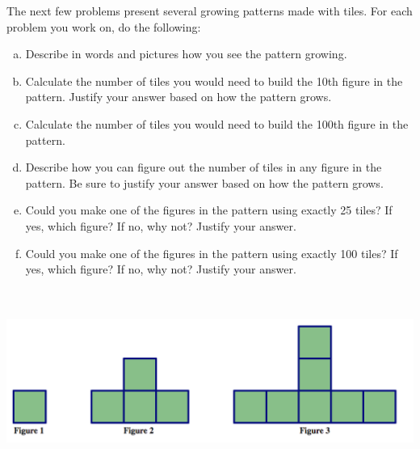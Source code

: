 The next few problems present several growing patterns made with tiles.  For each problem you work on, do the following:
\begin{enumerate}[(a)]
\item
Describe in words and pictures how you see the pattern growing.\\

\item
Calculate the number of tiles you would need to build the 10th figure in the pattern.  Justify your answer based on how the pattern grows.\\

\item
Calculate the number of tiles you would need to build the 100th figure in the pattern.  \\

\item
Describe how you can figure out the number of tiles in any figure in the pattern.  Be sure to justify your answer based on how the pattern grows.\\

\item
Could you make one of the figures in the pattern using exactly 25 tiles?  If yes, which figure?  If no, why not?  Justify your answer.\\

\item
Could you make one of the figures in the pattern using exactly 100 tiles?  If yes, which figure?  If no, why not?    Justify your answer.\\



\end{enumerate}

\bigskip

\begin{problem}\ 

\begin{center}
\includegraphics[height=4.25cm]{pattern2}
\end{center}

\end{problem}

